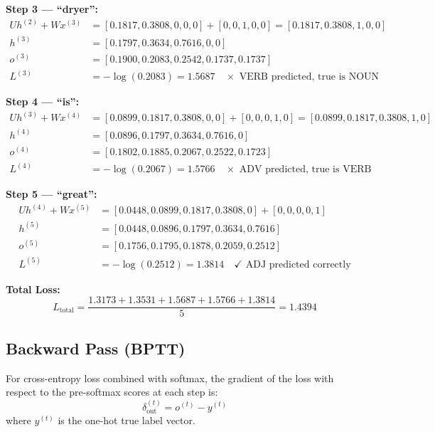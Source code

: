 \textbf{Step 3 --- ``dryer'':}
\begin{align*}
    U h^{(2)} + W x^{(3)} &= [0.1817,0.3808,0,0,0] + [0,0,1,0,0] = [0.1817,0.3808,1,0,0] \\
    h^{(3)} &= [0.1797,0.3634,0.7616,0,0] \\
    o^{(3)} &= [0.1900,0.2083,0.2542,0.1737,0.1737] \\
    L^{(3)} &= -\log(0.2083) = 1.5687 \quad \times \text{ VERB predicted, true is NOUN}
\end{align*}

\textbf{Step 4 --- ``is'':}
\begin{align*}
    U h^{(3)} + W x^{(4)} &= [0.0899,0.1817,0.3808,0,0] + [0,0,0,1,0] = [0.0899,0.1817,0.3808,1,0] \\
    h^{(4)} &= [0.0896,0.1797,0.3634,0.7616,0] \\
    o^{(4)} &= [0.1802,0.1885,0.2067,0.2522,0.1723] \\
    L^{(4)} &= -\log(0.2067) = 1.5766 \quad \times \text{ ADV predicted, true is VERB}
\end{align*}

\textbf{Step 5 --- ``great'':}
\begin{align*}
    U h^{(4)} + W x^{(5)} &= [0.0448,0.0899,0.1817,0.3808,0] + [0,0,0,0,1] \\
    h^{(5)} &= [0.0448,0.0896,0.1797,0.3634,0.7616] \\
    o^{(5)} &= [0.1756,0.1795,0.1878,0.2059,0.2512] \\
    L^{(5)} &= -\log(0.2512) = 1.3814 \quad \checkmark \text{ ADJ predicted correctly}
\end{align*}

\textbf{Total Loss:}
\begin{equation}
    L_{\text{total}} = \frac{1.3173 + 1.3531 + 1.5687 + 1.5766 + 1.3814}{5} = 1.4394
\end{equation}

\subsection{Backward Pass (BPTT)}

For cross-entropy loss combined with softmax, the gradient of the loss with respect to
the pre-softmax scores at each step is:
\begin{equation}
    \delta_{\text{out}}^{(t)} = o^{(t)} - y^{(t)}
\end{equation}
where $y^{(t)}$ is the one-hot true label vector.

